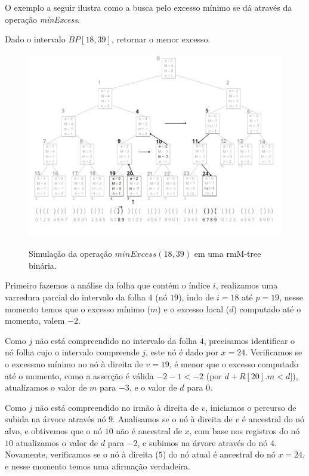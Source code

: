    O exemplo a seguir ilustra como a busca pelo excesso mínimo se dá através da operação \textit{minExcess}.
    \begin{example}
        Dado o intervalo $BP[18,39]$, retornar o menor excesso.

       \begin{figure}[!ht]
           \centering
             \caption[minExcess(18,39).]{Simulação da operação $minExcess(18,39)$ em uma rmM-tree binária.}
             \includegraphics[width=\columnwidth]{images/rmm-tree-bin-minexcess.png}
             \label{fig:bin-minexcess}
        \end{figure}

        Primeiro fazemos a análise da folha que contém o índice $i$, realizamos uma varredura parcial do intervalo da folha $4$ (nó $19$), indo de $i=18$ até $p=19$, nesse momento temos que o excesso mínimo ($m$) e o excesso local ($d$) computado até o momento, valem $-2$.

        Como $j$ não está compreendido no intervalo da folha $4$, precisamos identificar o nó folha cujo o intervalo compreende $j$, este nó é dado por $x=24$. Verificamos se o excessmo mínimo no nó à direita de $v=19$, é menor que o excesso computado até o momento, como a asserção é válida $-2 -1 < -2$ (por $d + R[20].m < d]$), atualizamos o valor de $m$ para $-3$, e o valor de $d$ para $0$.

        Como $j$ não está compreendido no irmão à direita de $v$, iniciamos o percurso de subida na árvore através nó $9$. Analisamos se o nó à direita de $v$ é ancestral do nó alvo, e obtivemos que o nó $10$ não é ancestral de $x$, com base nos registros do nó $10$ atualizamos o valor de $d$ para $-2$, e subimos na árvore através do nó $4$. Novamente, verificamos se o nó à direita ($5$) do nó atual é ancestral do nó $x=24$, e nesse momento
        temos uma afirmação verdadeira. 
        

\end{example}
